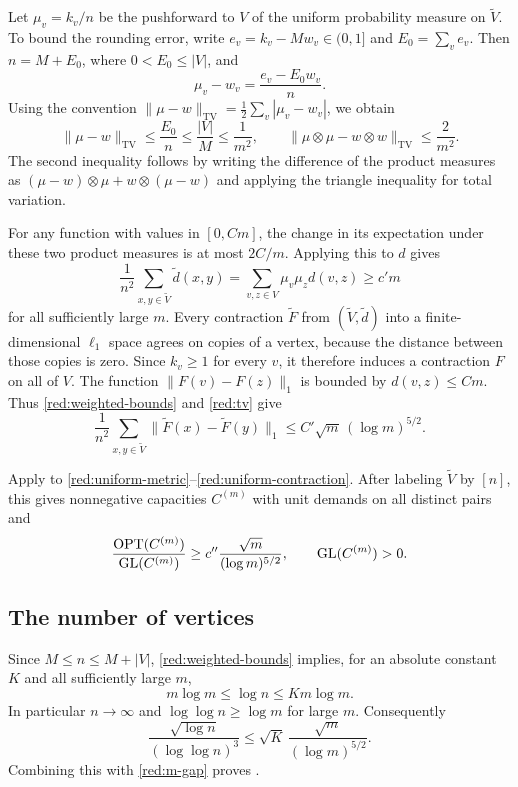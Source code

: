 Let $\mu_v=k_v/n$ be the pushforward to $V$ of the uniform probability
measure on $\widetilde V$.  To bound the rounding error, write
$e_v=k_v-Mw_v\in(0,1]$ and $E_0=\sum_v e_v$.  Then
$n=M+E_0$, where $0<E_0\leq |V|$, and
\[
\mu_v-w_v=\frac{e_v-E_0w_v}{n}.
\]
Using the convention
$\|\mu-w\|_{\mathrm{TV}}=\frac12\sum_v|\mu_v-w_v|$, we obtain
\begin{equation}
\label{red:tv}
\|\mu-w\|_{\mathrm{TV}}
\leq \frac{E_0}{n}
\leq \frac{|V|}{M}
\leq \frac{1}{m^2},
\qquad
\|\mu\otimes\mu-w\otimes w\|_{\mathrm{TV}}
\leq \frac{2}{m^2}.
\end{equation}
The second inequality follows by writing the difference of the product
measures as
$(\mu-w)\otimes\mu+w\otimes(\mu-w)$ and applying the triangle
inequality for total variation.

For any function with values in $[0,Cm]$, the change in its expectation
under these two product measures is at most $2C/m$.
Applying this to $d$ gives
\begin{equation}
\label{red:uniform-metric}
\frac{1}{n^2}\sum_{x,y\in\widetilde V}\widetilde d(x,y)
=\sum_{v,z\in V}\mu_v\mu_zd(v,z)
\geq c'm
\end{equation}
for all sufficiently large $m$.
Every contraction $\widetilde F$ from $(\widetilde V,\widetilde d)$
into a finite-dimensional $\ell_1$ space agrees on copies of a vertex,
because the distance between those copies is zero.  Since $k_v\geq1$
for every $v$, it therefore induces a contraction $F$ on all of $V$.
The function $\|F(v)-F(z)\|_1$ is bounded by $d(v,z)\leq Cm$.
Thus \eqref{red:weighted-bounds} and \eqref{red:tv} give
\begin{equation}
\label{red:uniform-contraction}
\frac{1}{n^2}\sum_{x,y\in\widetilde V}
\|\widetilde F(x)-\widetilde F(y)\|_1
\leq C'\sqrt m\,(\log m)^{5/2}.
\end{equation}

Apply  to
\eqref{red:uniform-metric}--\eqref{red:uniform-contraction}.
After labeling $\widetilde V$ by $[n]$, this gives nonnegative
capacities $C^{(m)}$ with unit demands on all distinct pairs and
\begin{equation}
\label{red:m-gap}
\frac{\operatorname{OPT}(C^{(m)})}{\operatorname{GL}(C^{(m)})}
\geq c''\frac{\sqrt m}{(\log m)^{5/2}},
\qquad \operatorname{GL}(C^{(m)})>0.
\end{equation}

\subsection{The number of vertices}

Since $M\leq n\leq M+|V|$, \eqref{red:weighted-bounds} implies, for
an absolute constant $K$ and all sufficiently large $m$,
\begin{equation}
\label{red:size}
m\log m\leq\log n\leq K m\log m.
\end{equation}
In particular $n\to\infty$ and $\log\log n\geq\log m$ for large $m$.
Consequently
\[
\frac{\sqrt{\log n}}{(\log\log n)^3}
\leq \sqrt K\,
\frac{\sqrt m}{(\log m)^{5/2}}.
\]
Combining this with \eqref{red:m-gap} proves .

